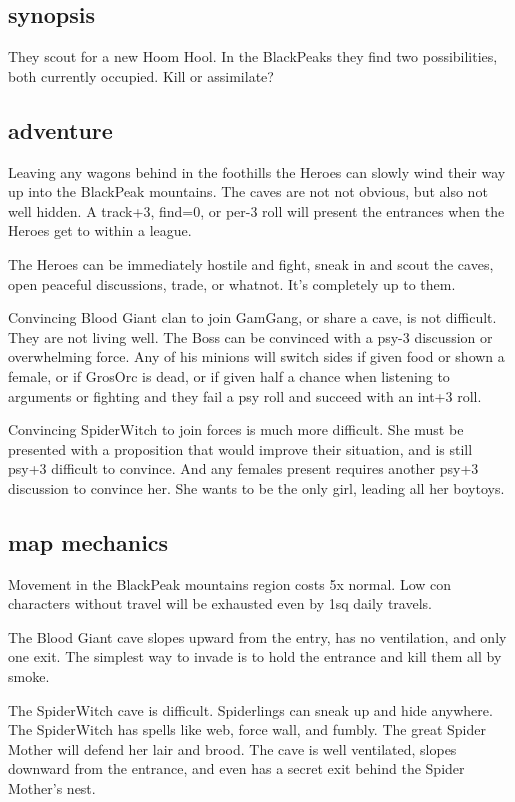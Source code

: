 \subsection*{synopsis}

They scout for a new Hoom Hool. In the BlackPeaks they find two possibilities, both currently occupied. Kill or assimilate?


\subsection*{adventure}

Leaving any wagons behind in the foothills the Heroes can slowly wind their way up into the BlackPeak mountains. The caves are not not obvious, but also not well hidden. A track+3, find=0, or per-3 roll will present the entrances when the Heroes get to within a league.

The Heroes can be immediately hostile and fight, sneak in and scout the caves, open peaceful discussions, trade, or whatnot. It's completely up to them.

Convincing Blood Giant clan to join GamGang, or share a cave, is not difficult. They are not living well. The Boss can be convinced with a psy-3 discussion or overwhelming force. Any of his minions will switch sides if given food or shown a female, or if GrosOrc is dead, or if given half a chance when listening to arguments or fighting and they fail a psy roll and succeed with an int+3 roll.

Convincing SpiderWitch to join forces is much more difficult. She must be presented with a proposition that would improve their situation, and is still psy+3 difficult to convince. And any females present requires another psy+3 discussion to convince her. She wants to be the only girl, leading all her boytoys.


\subsection*{map mechanics}

Movement in the BlackPeak mountains region costs 5x normal. Low con characters without travel will be exhausted even by 1sq daily travels.

The Blood Giant cave slopes upward from the entry, has no ventilation, and only one exit. The simplest way to invade is to hold the entrance and kill them all by smoke.

The SpiderWitch cave is difficult. Spiderlings can sneak up and hide anywhere. The SpiderWitch has spells like web, force wall, and fumbly. The great Spider Mother will defend her lair and brood. The cave is well ventilated, slopes downward from the entrance, and even has a secret exit behind the Spider Mother's nest.


